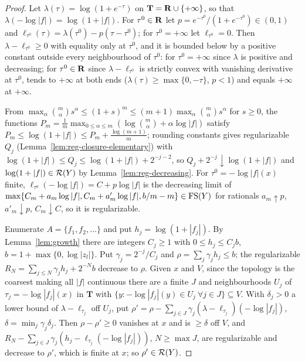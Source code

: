 \begin{proof}
Let $\lambda(\tau)=\log(1+e^{-\tau})$ on $\mathbf T=\mathbf{R}\cup\{+\infty\}$, so that
$\lambda(-\log|f|)=\log(1+|f|)$. For $\tau^0\in\mathbf{R}$ let $p=e^{-\tau^0}/(1+e^{-\tau^0})\in(0,1)$ and
$\ell_{\tau^0}(\tau)=\lambda(\tau^0)-p(\tau-\tau^0)$; for $\tau^0=+\infty$ let $\ell_{\tau^0}=0$.
Then $\lambda-\ell_{\tau^0}\ge0$ with equality only at $\tau^0$, and it is bounded below by a positive
constant outside every neighbourhood of $\tau^0$: for $\tau^0=+\infty$ since $\lambda$ is positive and
decreasing; for $\tau^0\in\mathbf{R}$ since $\lambda-\ell_{\tau^0}$ is strictly convex with vanishing
derivative at $\tau^0$, tends to $+\infty$ at both ends ($\lambda(\tau)\ge\max\{0,-\tau\}$, $p<1$) and
equals $+\infty$ at $+\infty$.

From $\max_\alpha\binom m\alpha s^\alpha\le(1+s)^m\le(m+1)\max_\alpha\binom m\alpha s^\alpha$ for $s\ge0$, the
functions $P_m=\frac1m\max_{0\le\alpha\le m}(\log\binom m\alpha+\alpha\log|f|)$ satisfy
$P_m\le\log(1+|f|)\le P_m+\frac{\log(m+1)}m$; rounding constants gives regularizable
$Q_j$ (Lemma~\ref{lem:reg-closure-elementary}) with $\log(1+|f|)\le Q_j\le\log(1+|f|)+2^{-j-2}$, so
$Q_j+2^{-j}\downarrow\log(1+|f|)$ and $\log(1+|f|)\in\mathcal{R}(Y)$ by Lemma~\ref{lem:reg-decreasing}. For
$\tau^0=-\log|f|(x)$ finite, $\ell_{\tau^0}(-\log|f|)=C+p\log|f|$ is the decreasing limit of
$\max\{C_m+a_m\log|f|,C_m+a'_m\log|f|,b/m-m\}\in\mathrm{FS}(Y)$ for rationals $a_m\uparrow p$,
$a'_m\downarrow p$, $C_m\downarrow C$, so it is regularizable.

Enumerate $A=\{f_1,f_2,\dots\}$ and put $h_j=\log(1+|f_j|)$. By Lemma~\ref{lem:growth} there are
integers $C_j\ge1$ with $0\le h_j\le C_jb$, $b=1+\max\{0,\log|z_l|\}$. Put $\gamma_j=2^{-j}/C_j$ and
$\rho=\sum_j\gamma_jh_j\le b$; the regularizable $R_N=\sum_{j\le N}\gamma_jh_j+2^{-N}b$ decrease to
$\rho$. Given $x$ and $V$, since the topology is the coarsest making all $|f|$ continuous there are
a finite $J$ and neighbourhoods $U_j$ of $\tau_j=-\log|f_j|(x)$ in $\mathbf T$ with
$\{y:-\log|f_j|(y)\in U_j\ \forall j\in J\}\subseteq V$. With $\delta_j>0$ a lower bound of
$\lambda-\ell_{\tau_j}$ off $U_j$, put
$\rho'=\rho-\sum_{j\in J}\gamma_j(\lambda-\ell_{\tau_j})(-\log|f_j|)$, $\delta=\min_j\gamma_j\delta_j$. Then
$\rho-\rho'\ge0$ vanishes at $x$ and is $\ge\delta$ off $V$, and
$R_N-\sum_{j\in J}\gamma_j(h_j-\ell_{\tau_j}(-\log|f_j|))$, $N\ge\max J$, are regularizable and decrease
to $\rho'$, which is finite at $x$; so $\rho'\in\mathcal{R}(Y)$.
\end{proof}

